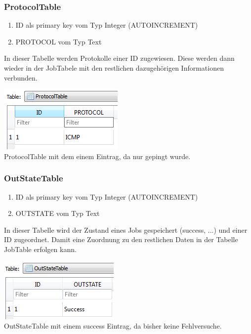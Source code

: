 \documentclass[12pt,a4paper]{report}
\begin{document}
\begin{onehalfspace}
\subsubsection{ProtocolTable}
\begin{enumerate}
\item ID als primary key vom Typ Integer (AUTOINCREMENT)
\item PROTOCOL vom Typ Text
\end{enumerate}
In dieser Tabelle werden Protokolle einer ID zugewiesen. Diese werden dann wieder in der JobTabele mit den restlichen dazugehörigen Informationen verbunden.
\begin{center}
\includegraphics[scale=0.8]{img/db-tb-protocol.png}\\
ProtocolTable mit dem einem Eintrag, da nur gepingt wurde.
\end{center}
\subsubsection{OutStateTable}
\begin{enumerate}
\item ID als primary key vom Typ Integer (AUTOINCREMENT)
\item OUTSTATE vom Typ Text
\end{enumerate}
In dieser Tabelle wird der Zustand eines Jobs gespeichert (success, ...) und einer ID zugeordnet. Damit eine Zuordnung zu den restlichen Daten in der Tabelle JobTable erfolgen kann.
\begin{center}
\includegraphics[scale=0.8]{img/db-tb-out.png}\\
OutStateTable mit einem success Eintrag, da bisher keine Fehlversuche.
\end{center}

\end{onehalfspace}
\end{document}
